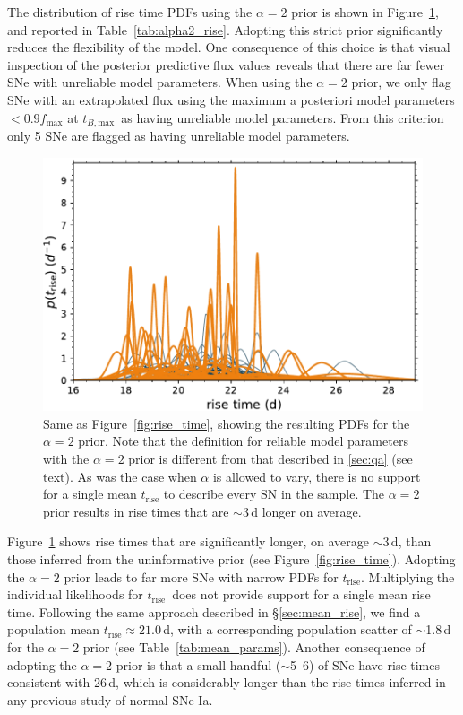\documentclass[twocolumn]{aastex63}
\newcommand{\trise}{$t_\mathrm{rise}$}
\newcommand{\tbmax}{$t_{B,\mathrm{max}}$}
\begin{document}
The distribution of rise time PDFs using the $\alpha = 2$ prior is shown in
Figure~\ref{fig:tsquared_rise}, and reported in Table~\ref{tab:alpha2_rise}.
Adopting this strict prior significantly reduces the flexibility of the model.
One consequence of this choice is that visual inspection of the posterior
predictive flux values reveals that there are far fewer SNe with unreliable
model parameters. When using the $\alpha = 2$ prior, we only flag SNe with an
extrapolated flux using the maximum a posteriori model parameters $< 0.9
f_\mathrm{max}$ at \tbmax\ as having unreliable model parameters. From this
criterion only 5 SNe are flagged as having unreliable model parameters.



\begin{figure}
    \centering
    \includegraphics[width=1\linewidth]{./figures/tsquared_rise_time.pdf}
    \caption{Same as Figure~\ref{fig:rise_time}, showing the resulting PDFs
    for the $\alpha = 2$ prior. Note that the definition for reliable model
    parameters with the $\alpha = 2$ prior is different from that described in
    \ref{sec:qa} (see text). As was the case when $\alpha$ is allowed to vary,
    there is no support for a single mean $t_\mathrm{rise}$ to describe every
    SN in the sample. The $\alpha = 2$ prior results in rise times that are
    $\sim$3\,d longer on average.}
    \label{fig:tsquared_rise}
\end{figure}

Figure~\ref{fig:tsquared_rise} shows rise times that are significantly longer,
on average $\sim$3\,d, than those inferred from the uninformative prior (see
Figure~\ref{fig:rise_time}). Adopting the $\alpha = 2$ prior leads to far more
SNe with narrow PDFs for \trise. Multiplying the individual likelihoods for
\trise\ does not provide support for a single mean rise time. Following the
same approach described in \S\ref{sec:mean_rise}, we find a population mean
\trise\;$\approx 21.0$\,d, with a corresponding population scatter of
$\sim$1.8\,d for the $\alpha = 2$ prior (see Table~\ref{tab:mean_params}).
Another consequence of adopting the $\alpha = 2$ prior is that a small handful
($\sim$5--6) of SNe have rise times consistent with 26\,d, which is
considerably longer than the rise times inferred in any previous study of
normal SNe Ia.
\end{document}
